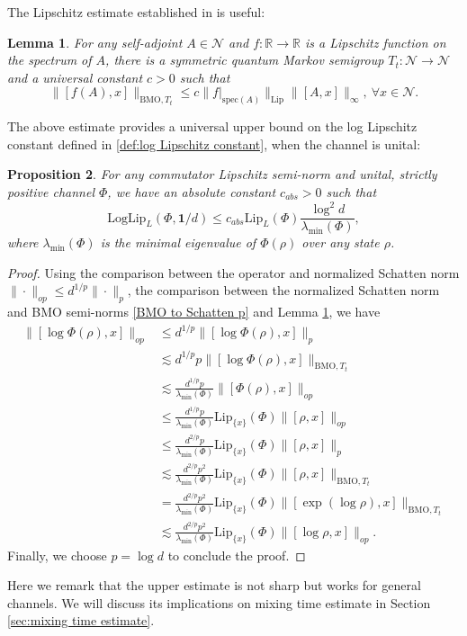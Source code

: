 \documentclass[11pt,reqno]{amsart}
\numberwithin{equation}{section}
\newtheorem{lemma}{Lemma}[section]
\newtheorem{prop}[lemma]{Proposition}
\newcommand{\mb}{\mathbb}
\newcommand{\mc}{\mathcal}
\newcommand{\Lip}{\mathrm{Lip}}
\begin{document}
The Lipschitz estimate established in \cite{caspers2020bmo} is useful:
\begin{lemma}\label{lemma:BMO}
    For any self-adjoint $A \in \mc N$ and $f: \mb R \to \mb R$ is a Lipschitz function on the spectrum of $A$, there is a symmetric quantum Markov semigroup $T_t: \mc N \to \mc N$ and a universal constant $c>0$ such that 
    \begin{equation}
        \|[f(A),x]\|_{\mathrm{BMO}, T_t} \le c \|f\big|_{\mathrm{spec}(A)}\|_{\Lip} \|[A,x] \|_{\infty},\ \forall x \in \mc N.
    \end{equation}
\end{lemma}
The above estimate provides a universal upper bound on the log Lipschitz constant defined in \eqref{def:log Lipschitz constant}, when the channel is unital:
\begin{prop}\label{prop:upper bound on log Lipschitz}
    For any commutator Lipschitz semi-norm and unital, strictly positive channel $\Phi$, we have an absolute constant $c_{abs}>0$ such that 
    \begin{equation}
        \mathrm{Log}\Lip_L(\Phi,\textbf{1}/d) \le c_{abs} \Lip_L(\Phi)\frac{\log^2d }{\lambda_{\min}(\Phi)},
    \end{equation}
    where $\lambda_{\min}(\Phi)$ is the minimal eigenvalue of $\Phi(\rho)$ over any state $\rho$.
\end{prop}

\begin{proof}
Using the comparison between the operator and normalized Schatten norm $\|\cdot\|_{op} \le d^{1/p} \|\cdot\|_p$, the comparison between the normalized Schatten norm and BMO semi-norms \eqref{BMO to Schatten p} and Lemma \ref{lemma:BMO}, we have
\begin{align*}
    \|[\log \Phi(\rho), x]\|_{op} & \le d^{1/p} \|[\log \Phi(\rho), x]\|_{p} \\
    & \lesssim d^{1/p} p \|[\log \Phi(\rho), x]\|_{\mathrm{BMO},T_t} \\
    & \lesssim \frac{d^{1/p} p}{\lambda_{\min}(\Phi)} \|[\Phi(\rho),x]\|_{op} \\
    & \le \frac{d^{1/p} p}{\lambda_{\min}(\Phi)} \Lip_{\{x\}}(\Phi) \|[\rho,x]\|_{op} \\
    & \le \frac{d^{2/p} p}{\lambda_{\min}(\Phi)} \Lip_{\{x\}}(\Phi) \|[\rho,x]\|_{p} \\
    & \lesssim \frac{d^{2/p} p^2}{\lambda_{\min}(\Phi)} \Lip_{\{x\}}(\Phi) \|[\rho,x]\|_{\mathrm{BMO},T_t} \\
    & = \frac{d^{2/p} p^2}{\lambda_{\min}(\Phi)} \Lip_{\{x\}}(\Phi) \|[\exp(\log \rho),x]\|_{\mathrm{BMO},T_t} \\
    & \lesssim \frac{d^{2/p} p^2}{\lambda_{\min}(\Phi)} \Lip_{\{x\}}(\Phi) \|[\log \rho,x]\|_{op}.
\end{align*}
Finally, we choose $p = \log d$ to conclude the proof.
\end{proof}
Here we remark that the upper estimate is not sharp but works for general channels. We will discuss its implications on mixing time estimate in Section \ref{sec:mixing time estimate}.
\end{document}

